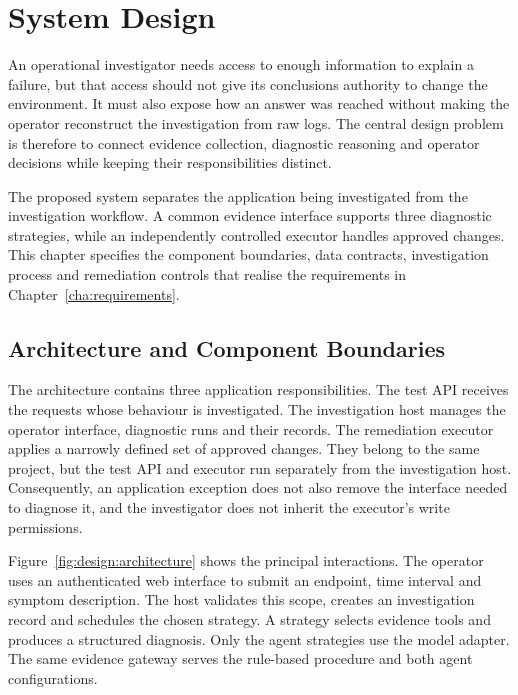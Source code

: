 \chapter{System Design}
\label{cha:design}

An operational investigator needs access to enough information to explain
a failure, but that access should not give its conclusions authority to
change the environment. It must also expose how an answer was reached
without making the operator reconstruct the investigation from raw logs.
The central design problem is therefore to connect evidence collection,
diagnostic reasoning and operator decisions while keeping their
responsibilities distinct.

The proposed system separates the application being investigated from the
investigation workflow. A common evidence interface supports three
diagnostic strategies, while an independently controlled executor handles
approved changes. This chapter specifies the component boundaries, data
contracts, investigation process and remediation controls that realise
the requirements in Chapter~\ref{cha:requirements}.

\section{Architecture and Component Boundaries}
\label{sec:design:architecture}

The architecture contains three application responsibilities. The test API
receives the requests whose behaviour is investigated. The investigation
host manages the operator interface, diagnostic runs and their records.
The remediation executor applies a narrowly defined set of approved
changes. They belong to the same project, but the test API and executor
run separately from the investigation host. Consequently, an application
exception does not also remove the interface needed to diagnose it, and
the investigator does not inherit the executor's write permissions.

Figure~\ref{fig:design:architecture} shows the principal interactions.
The operator uses an authenticated web interface to submit an endpoint,
time interval and symptom description. The host validates this scope,
creates an investigation record and schedules the chosen strategy. A
strategy selects evidence tools and produces a structured diagnosis.
Only the agent strategies use the model adapter. The same evidence
gateway serves the rule-based procedure and both agent configurations.

